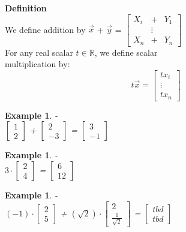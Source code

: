 \documentclass[12pt]{article}
\newtheorem{example}[theorem]{Example}
\begin{document}
\textbf{Definition} \\
We define addition by $\vec{x}$ + $\vec{y}$ \: = ${\left[\begin{matrix}
    X_i &+ &Y_1 \\ & \vdots \\ X_n &+ &Y_n
\end{matrix}\right]}$ \\

For any real scalar $t \in \mathbb{R}$, we define scalar \\ multiplication by: $$t\vec{x} = {\left[\begin{matrix}
    tx_i\\ \vdots \\ tx_n
\end{matrix}\right]}$$

\begin{example} - \\
${\left[\begin{matrix}
   1 \\ 2
\end{matrix}\right]}$ +
${\left[\begin{matrix}
   2 \\ -3
\end{matrix}\right]}$ = 
${\left[\begin{matrix}
   3 \\ -1
\end{matrix}\right]}$
\end{example}

\begin{example} - \\
$3\cdot{\left[\begin{matrix}
   2 \\ 4
\end{matrix}\right]}$ = 
${\left[\begin{matrix}
   6 \\ 12
\end{matrix}\right]}$
\end{example}

\begin{example} - \\
$(-1)\cdot{\left[\begin{matrix}
   2 \\ 5
\end{matrix}\right]}$ +
$(\sqrt{2})\cdot {\left[\begin{matrix}
   2 \\ \frac{1}{\sqrt{2}}
\end{matrix}\right]}$ = 
${\left[\begin{matrix}
   tbd \\ tbd
\end{matrix}\right]}$
\end{example}
\end{document}
